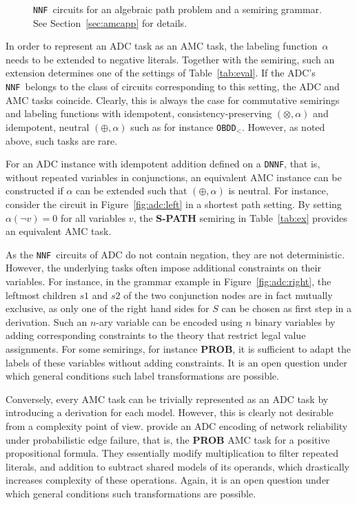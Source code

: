 \documentclass{article}
\theoremstyle{plain}
\theoremstyle{definition}
\newcommand{\NNF}{{\tt NNF}}
\newcommand{\DNNF}{{\tt DNNF}}
\newcommand{\OBDDo}{{\tt OBDD$_<$}}
\begin{document}
\begin{figure}
\center
{}
\caption{\NNF\ circuits for an algebraic path problem and a
  semiring grammar. See Section~\ref{sec:amcapp} for details.}
\label{fig:adc}
\end{figure} 

In order to represent an ADC task as an AMC task, the
labeling function~$\alpha$ needs to be extended to negative
literals. Together with the semiring, such an extension determines one of the
settings of Table~\ref{tab:eval}. If the ADC's \NNF\ belongs to the class of circuits corresponding to this
setting, the ADC and AMC tasks coincide. Clearly, this is always the
case for commutative semirings and labeling functions with idempotent, consistency-preserving
$(\otimes,\alpha)$ and idempotent, neutral $(\oplus,\alpha)$ such as 
for instance \OBDDo. However, as noted above, such tasks are rare.

For an ADC instance with idempotent addition defined on a \DNNF, that
is, without repeated variables in conjunctions, an
equivalent AMC instance can be constructed if $\alpha$
can be extended such that $(\oplus,\alpha)$ is neutral. For instance, consider the
circuit in Figure~\ref{fig:adc:left} in a shortest path
setting. By setting $\alpha(\neg v)=0$ for all variables $v$, the \textbf{S-PATH} semiring in Table~\ref{tab:ex} provides an
equivalent AMC task.
 
As the \NNF\ circuits of ADC do not contain negation, they are not 
deterministic. However, the underlying
tasks often impose additional constraints on their variables. For
instance, in the grammar example in Figure~\ref{fig:adc:right}, the leftmost
children $s1$ and $s2$ of the
two conjunction nodes are in fact mutually exclusive, as only one of
the right hand sides for $S$ can be chosen as first step in a
derivation. Such an $n$-ary variable can be encoded using $n$
binary variables by adding corresponding constraints to the theory
that restrict legal value assignments. For some semirings,
for instance \textbf{PROB}, it is sufficient to adapt the labels of
these variables without adding constraints. It is an open question under which general
conditions such label transformations are possible.

Conversely, every AMC task can be trivially represented as an ADC task
by introducing a derivation for each model. However, this is clearly
not desirable from a complexity point of view. 
\citet{baras2010path} provide an ADC encoding of network
reliability under probabilistic edge failure, that is, the \textbf{PROB} AMC
task for a positive propositional formula. They essentially modify multiplication to filter repeated literals,
and addition to subtract shared models of its operands, which 
drastically 
increases complexity of these operations. 
Again, it is an open question under which general
conditions such transformations are possible. 
\end{document}
